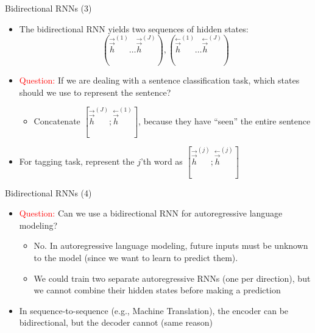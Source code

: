 
\begin{vbframe}{Bidirectional RNNs (3)}

\vfill

\begin{itemize}
	\item The bidirectional RNN yields two sequences of hidden states:
	$$(\overset{\rightarrow}{\vec h}^{(1)} \ldots \overset{\rightarrow}{\vec h}^{(J)}), (\overset{\leftarrow}{\vec h}^{(1)} \ldots \overset{\leftarrow}{\vec h}^{(J)})$$
	\item \textcolor{red}{Question:} If we are dealing with a sentence classification task, which states should we use to represent the sentence?
		\begin{itemize}
			\item Concatenate $[\overset{\rightarrow}{\vec h}^{(J)};\overset{\leftarrow}{\vec h}^{(1)}]$, because they have ``seen'' the entire sentence
		\end{itemize}
	\item For tagging task, represent the $j$'th word as $[\overset{\rightarrow}{\vec h}^{(j)};\overset{\leftarrow}{\vec h}^{(j)}]$
\end{itemize}

\vfill

\end{vbframe}


\begin{vbframe}{Bidirectional RNNs (4)}

\vfill

\begin{itemize}
	\item \textcolor{red}{Question:} Can we use a bidirectional RNN for autoregressive language modeling?
		\begin{itemize}
			\item No. In autoregressive language modeling, future inputs must be unknown to the model (since we want to learn to predict them).
			\item We could train two separate autoregressive RNNs (one per direction), but we cannot combine their hidden states before making a prediction
		\end{itemize}
	\item In sequence-to-sequence (e.g., Machine Translation), the encoder can be bidirectional, but the decoder cannot (same reason)
\end{itemize}

\vfill

\end{vbframe}


\endlecture

